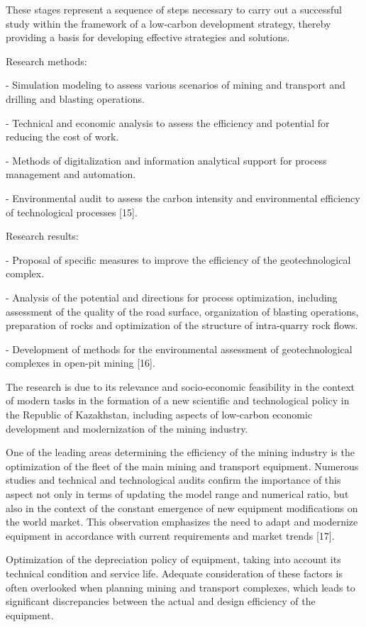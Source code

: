 \begin{multicols}{2}
These stages represent a sequence of steps necessary to carry out a
successful study within the framework of a low-carbon development
strategy, thereby providing a basis for developing effective strategies
and solutions.

Research methods:

- Simulation modeling to assess various scenarios of mining and
transport and drilling and blasting operations.

- Technical and economic analysis to assess the efficiency and potential
for reducing the cost of work.

- Methods of digitalization and information analytical support for
process management and automation.

- Environmental audit to assess the carbon intensity and environmental
efficiency of technological processes {[}15{]}.

Research results:

- Proposal of specific measures to improve the efficiency of the
geotechnological complex.

- Analysis of the potential and directions for process optimization,
including assessment of the quality of the road surface, organization of
blasting operations, preparation of rocks and optimization of the
structure of intra-quarry rock flows.

- Development of methods for the environmental assessment of
geotechnological complexes in open-pit mining {[}16{]}.

The research is due to its relevance and socio-economic feasibility in
the context of modern tasks in the formation of a new scientific and
technological policy in the Republic of Kazakhstan, including aspects of
low-carbon economic development and modernization of the mining
industry.

One of the leading areas determining the efficiency of the mining
industry is the optimization of the fleet of the main mining and
transport equipment. Numerous studies and technical and technological
audits confirm the importance of this aspect not only in terms of
updating the model range and numerical ratio, but also in the context of
the constant emergence of new equipment modifications on the world
market. This observation emphasizes the need to adapt and modernize
equipment in accordance with current requirements and market trends
{[}17{]}.

Optimization of the depreciation policy of equipment, taking into
account its technical condition and service life. Adequate consideration
of these factors is often overlooked when planning mining and transport
complexes, which leads to significant discrepancies between the actual
and design efficiency of the equipment.


\end{multicols}
